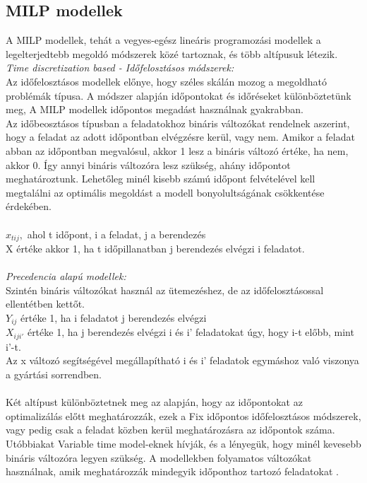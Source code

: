 \documentclass {report}
\begin{document}
\subsection{MILP modellek}
  A MILP modellek, tehát a vegyes-egész lineáris programozási modellek a legelterjedtebb megoldó módszerek közé tartoznak, és több altípusuk létezik.\\
  \emph{Time discretization based - Időfelosztásos módszerek:}\\
   Az időfelosztásos modellek előnye, hogy széles skálán mozog a megoldható problémák típusa.
  A módszer alapján időpontokat és időréseket különböztetünk meg, A MILP modellek időpontos megadást használnak gyakrabban.  \\
  Az időbeosztásos típusban a feladatokhoz bináris változókat rendelnek aszerint, hogy a feladat az adott időpontban elvégzésre kerül, vagy nem. Amikor a feladat abban az időpontban megvalósul, akkor 1 lesz a bináris változó értéke, ha nem, akkor 0. Így annyi bináris változóra lesz szükség, ahány időpontot meghatároztunk. Lehetőleg minél kisebb számú időpont felvételével kell megtalálni az optimális megoldást a modell bonyolultságának csökkentése érdekében.\\\\
  $x_{tij},$ ahol t időpont, i a feladat, j a berendezés\\ X értéke akkor 1, ha t időpillanatban j berendezés elvégzi i feladatot.\\\\
 \emph{Precedencia alapú modellek:}\\
  Szintén bináris változókat használ az ütemezéshez, de az időfelosztásossal ellentétben kettőt. \\
  $Y_{ij}$ értéke 1, ha i feladatot j berendezés elvégzi\\
  $X_{iji'}$ értéke 1, ha j berendezés elvégzi i és i' feladatokat úgy, hogy i-t előbb, mint i'-t.\\
  Az x változó segítségével megállapítható i és i' feladatok egymáshoz való viszonya a gyártási sorrendben. \\\\
 Két altípust különböztetnek meg az alapján, hogy az időpontokat az optimalizálás előtt meghatározzák, ezek a Fix időpontos időfelosztásos módszerek, vagy pedig csak a feladat közben kerül meghatározásra az időpontok száma. Utóbbiakat Variable time model-eknek hívják, és a lényegük, hogy minél kevesebb bináris változóra legyen szükség. A modellekben folyamatos változókat használnak, amik meghatározzák mindegyik időponthoz tartozó feladatokat \cite{Mendez2006}. 
 
\end{document}
